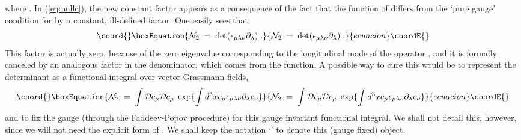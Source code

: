 \documentclass[a4paper,12pt]{article}
\begin{document}
where \coordHE{}. In (\ref{eq:nullc}), the new
constant factor \coordHE{} appears as a consequence of the fact
that the \myHighlight{$\delta$}\coordHE{} function of \coordHE{} differs from the `pure
gauge' condition for \coordHE{} by a constant, ill-defined factor.  One
easily sees that:
\begin{equation}\coord{}\boxEquation{
  \label{eq:defn2}
  {\mathcal N}_2 \;=\; \det (\epsilon_{\mu\lambda\nu}
  \partial_\lambda) \;.
}{
  {\mathcal N}_2 \;=\; \det (\epsilon_{\mu\lambda\nu}
  \partial_\lambda) \;.
}{ecuacion}\coordE{}\end{equation}
This factor is actually zero, because of the zero eigenvalue
corresponding to the longitudinal mode of the operator \myHighlight{$\epsilon_{\mu\lambda\nu} \partial_\lambda$}\coordHE{},
and it is formally canceled by an analogous factor in the denominator,
which comes from the \myHighlight{$\delta$}\coordHE{} function. A possible way to cure this would
be to represent the determinant as a functional integral over vector
Grassmann fields,
\begin{equation}\coord{}\boxEquation{
  \label{eq:n21}
   {\mathcal N}_2 \;=\; \int {\mathcal D}{\bar c}_\mu {\mathcal
     D}c_\mu \; \exp\{\int d^3x {\bar c}_\mu \epsilon_{\mu\lambda\nu} \partial_\lambda c_\nu \}
}{
  {\mathcal N}_2 \;=\; \int {\mathcal D}{\bar c}_\mu {\mathcal
     D}c_\mu \; \exp\{\int d^3x {\bar c}_\mu \epsilon_{\mu\lambda\nu} \partial_\lambda c_\nu \}
}{ecuacion}\coordE{}\end{equation}
and to fix the gauge (through the Faddeev-Popov procedure) for this
gauge invariant functional integral. We shall not detail this,
however, since we will not need the explicit form of \coordHE{}.
We shall keep the notation `\coordHE{}' to denote this (gauge
fixed) object.
\end{document}
